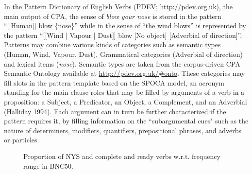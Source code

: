 \documentclass[output=paper]{langsci/langscibook}
\begin{document}
In the Pattern Dictionary of English Verbs (PDEV;
\url{http://pdev.org.uk}), the main output of CPA, the sense of  \textit{blow
  your nose} is stored in the pattern “[[Human]] blow \{nose\}” while in
the sense of “the wind blows” is represented by the pattern “$[$$[$Wind |
Vapour | Dust$]$$]$ blow $[$No object$]$ $[$Adverbial of direction$]$”. Patterns
may combine various kinds of categories such as semantic types (Human,
Wind, Vapour, Dust), Grammatical categories (Adverbial of direction)
and lexical items (\textit{nose}). Semantic types are taken from the
corpus-driven CPA Semantic Ontology available at
\url{http://pdev.org.uk/#onto}. These categories may fill slots in the
pattern template based on the SPOCA model, an acronym standing for the
main clause roles that may be filled by arguments of a verb in a
proposition: a Subject, a Predicator, an Object, a Complement, and an
Adverbial (Halliday 1994). Each argument can in turn be further
characterized if the pattern requires it, by filling information on the
``subargumental cues" such as the nature of determiners, modifiers,
quantifiers, prepositional phrases, and adverbs or particles.

\begin{figure}[h]
\caption{Proportion of NYS and complete and ready verbs w.r.t. frequency range in BNC50.}
\label{fig:04:01}
\end{figure}
\end{document}
